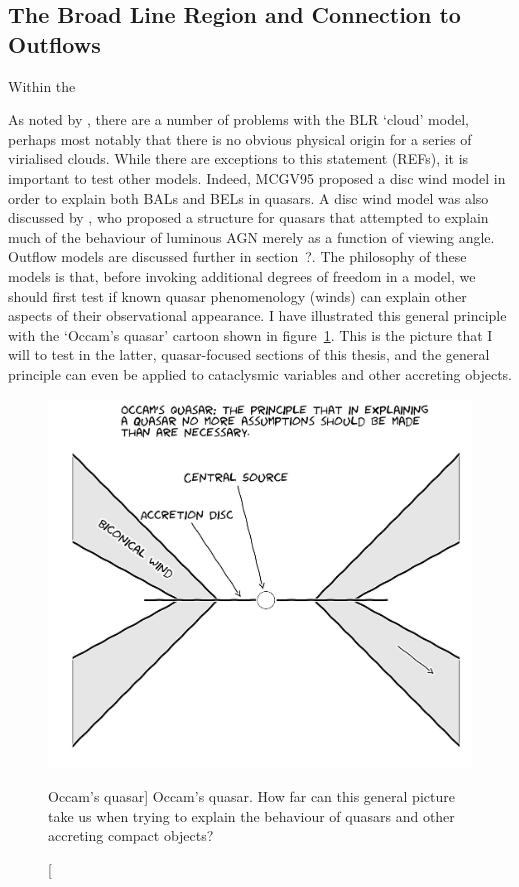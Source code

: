 \subsection{The Broad Line Region and Connection to Outflows}

Within the 

As noted by \cite[][hereafter MCGV95]{MCGV95}, there are a number of problems with
the BLR `cloud' model, perhaps most notably that there is no obvious 
physical origin for a series of virialised clouds. While there are exceptions
to this statement (REFs), it is important to test other models.
Indeed, MCGV95 proposed a disc wind model in order to explain both BALs and BELs
in quasars. A disc wind model was also  discussed by \cite{elvis2000}, 
who proposed a structure for quasars that attempted to explain much 
of the behaviour of luminous AGN
merely as a function of viewing angle. Outflow models are discussed further in section~?.
The philosophy of these models is that, before invoking additional
degrees of freedom in a model, we should first test if known quasar phenomenology 
(winds) can explain other aspects of their observational appearance.
I have illustrated this general principle with the `Occam's quasar' 
cartoon shown in figure~\ref{fig:occam}. This is the picture that I will
to test in the latter, quasar-focused sections of this thesis, and the general
principle can even be applied to cataclysmic variables and other accreting objects.


\begin{figure}
\centering
\includegraphics[width=1.0\textwidth]{figures/01-intro/occam.jpg}
\caption
[Occam's quasar]
{
Occam's quasar. How far can this general picture take us when trying to explain
the behaviour of quasars and other accreting compact objects?
} 
\label{fig:occam}
\end{figure}


